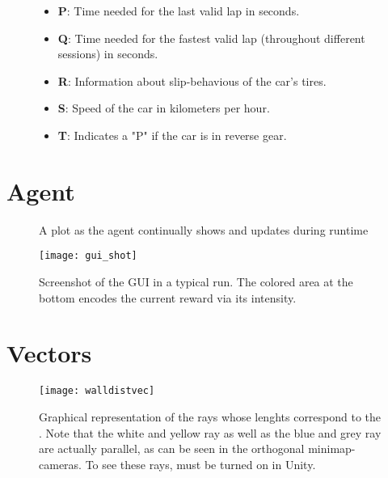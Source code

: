 \begin{figure}[h!t]
\begin{itemize}
		\item \textbf{P}: Time needed for the last valid lap in seconds.
		\item \textbf{Q}: Time needed for the fastest valid lap (throughout different sessions) in seconds.
		\item \textbf{R}: Information about slip-behavious of the car's tires.
		\item \textbf{S}: Speed of the car in kilometers per hour.
		\item \textbf{T}: Indicates a "P" if the car is in reverse gear.
	\end{itemize}
\end{figure}

\clearpage
\section{Agent}


\begin{figure}[h]
	{%
		\setlength{\fboxsep}{0pt}%
		\setlength{\fboxrule}{1pt}%
	}%
	\centering
	\caption{A plot as the agent continually shows and updates during runtime}
	\label{fig:plot}
\end{figure}

\begin{figure}[h]
	\texttt{[image: gui\_shot]}
	\centering
	\caption[Screenshot of the GUI in a typical run.]{Screenshot of the GUI in a typical run. The colored area at the bottom encodes the current reward via its intensity.}
	\label{fig:gui}
\end{figure}



\clearpage
\section{Vectors}

\begin{figure}[h]
	\texttt{[image: walldistvec]}
	\centering
	\caption[Graphical representation of the rays used for the ]{Graphical representation of the rays whose lenghts correspond to the . Note that the white and yellow ray as well as the blue and grey ray are actually parallel, as can be seen in the orthogonal minimap-cameras. To see these rays,  must be turned on in Unity.}
	\label{fig:walldistvec}
\end{figure}